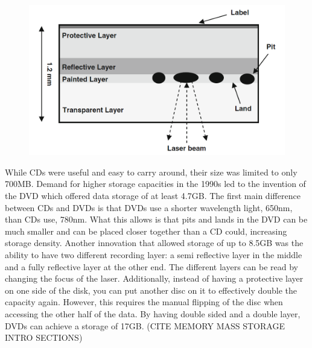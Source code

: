 \documentclass[ aip, 12pt]{revtex4-1} %
\begin{document}
\begin{figure}[H]
\centerline{\includegraphics[scale=.45]{cdR.png}}
\caption{ }
\label{cdR}
\end{figure} 

While CDs were useful and easy to carry around, their size was limited to only 700MB. Demand for higher storage capacities in the 1990s led to the invention of the DVD which offered data storage of at least 4.7GB. The first main difference between CDs and DVDs is that DVDs use a shorter wavelength light, 650nm, than CDs use, 780nm. What this allows is that pits and lands in the DVD can be much smaller and can be placed closer together than a CD could, increasing storage density. Another innovation that allowed storage of up to 8.5GB was the ability to have two different recording layer: a semi reflective layer in the middle and a fully reflective layer at the other end. The different layers can be read by changing the focus of the laser. Additionally, instead of having a protective layer on one side of the disk, you can put another disc on it to effectively double the capacity again. However, this requires the manual flipping of the disc when accessing the other half of the data. By having double sided and a double layer, DVDs can achieve a storage of 17GB. (CITE MEMORY MASS STORAGE INTRO SECTIONS)
\end{document}
